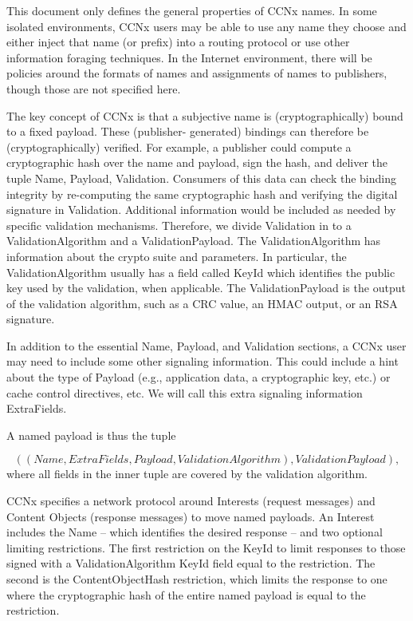 \documentclass[12pt]{article}
\begin{document}
This document only defines the general properties of CCNx names.  In
some isolated environments, CCNx users may be able to use any name
they choose and either inject that name (or prefix) into a routing
protocol or use other information foraging techniques. In the
Internet environment, there will be policies around the formats of
names and assignments of names to publishers, though those are not
specified here.

The key concept of CCNx is that a subjective name is
(cryptographically) bound to a fixed payload. These (publisher-
generated) bindings can therefore be (cryptographically) verified.
For example, a publisher could compute a cryptographic hash over the
name and payload, sign the hash, and deliver the tuple {Name,
Payload, Validation}.  Consumers of this data can check the binding
integrity by re-computing the same cryptographic hash and verifying
the digital signature in Validation.  Additional information would be
included as needed by specific validation mechanisms.  Therefore, we
divide Validation in to a ValidationAlgorithm and a
ValidationPayload.  The ValidationAlgorithm has information about the
crypto suite and parameters.  In particular, the ValidationAlgorithm
usually has a field called KeyId which identifies the public key used
by the validation, when applicable.  The ValidationPayload is the
output of the validation algorithm, such as a CRC value, an HMAC
output, or an RSA signature.

In addition to the essential Name, Payload, and Validation sections,
a CCNx user may need to include some other signaling information.
This could include a hint about the type of Payload (e.g.,
application data, a cryptographic key, etc.) or cache control
directives, etc.  We will call this extra signaling information
ExtraFields.

A named payload is thus the tuple

$$
((Name, ExtraFields, Payload, ValidationAlgorithm), ValidationPayload),
$$
where all fields in the inner tuple are covered by the validation algorithm.

CCNx specifies a network protocol around Interests (request messages)
and Content Objects (response messages) to move named payloads. An
Interest includes the Name -- which identifies the desired response
-- and two optional limiting restrictions.  The first restriction on
the KeyId to limit responses to those signed with a
ValidationAlgorithm KeyId field equal to the restriction. The second
is the ContentObjectHash restriction, which limits the response to
one where the cryptographic hash of the entire named payload is equal
to the restriction.
\end{document}
